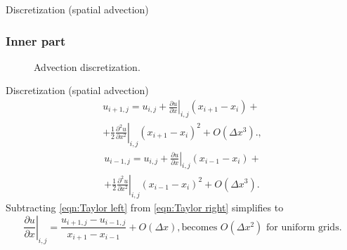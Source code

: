 \documentclass{beamer}
\begin{document}
	\begin{frame}{Discretization (spatial advection)}
	\subsubsection{Inner part}\label{subsubsec:advection-inner}
	\begin{figure}[H] %
	  \caption{Advection discretization.}\label{fig:ADV}
	\end{figure}	
	\end{frame}
	
	\begin{frame}{Discretization (spatial advection)}
	\begin{multline}\label{eqn:Taylor right} 
		u_{i+1,j}=u_{i,j}+\left.\frac{\partial u}{\partial x}\right|_{i,j}\left(x_{i+1}-x_{i}\right)+\\
		+\frac{1}{2}\left.\frac{\partial^2 u}{\partial x^2}\right|_{i,j}\left(x_{i+1}-x_{i}\right)^2+O\left(\Delta x^3\right).,
	\end{multline}
	\begin{multline}\label{eqn:Taylor left} 
		u_{i-1,j}=u_{i,j}+\left.\frac{\partial u}{\partial x}\right|_{i,j}\left(x_{i-1}-x_{i}\right)+\\
		+\frac{1}{2}\left.\frac{\partial^2 u}{\partial x^2}\right|_{i,j}\left(x_{i-1}-x_{i}\right)^2+O\left(\Delta x^3\right).
	\end{multline}
	Subtracting \eqref{eqn:Taylor left} from \eqref{eqn:Taylor right} simplifies to
	\begin{equation*}
		\left.\frac{\partial u}{\partial x}\right|_{i,j}=\frac{u_{i+1,j}-u_{i-1,j}}{x_{i+1}-x_{i-1}}+O(\Delta x), \text{becomes $O(\Delta x^2)$ for uniform grids.}
	\end{equation*}
	\end{frame}
\end{document}
